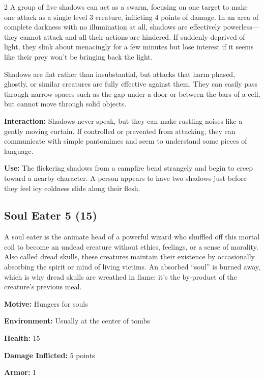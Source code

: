 \begin{multicols}{2}
A group of five shadows can act as a swarm, focusing on one target to make one attack as a single level 3 creature, inflicting 4 points of damage. In an area of complete darkness with no illumination at all, shadows are effectively powerless—they cannot attack and all their actions are hindered. If suddenly deprived of light, they slink about menacingly for a few minutes but lose interest if it seems like their prey won’t be bringing back the light. 

Shadows are flat rather than insubstantial, but attacks that harm phased, ghostly, or similar creatures are fully effective against them. They can easily pass through narrow spaces such as the gap under a door or between the bars of a cell, but cannot move through solid objects. 

\textbf{Interaction:} Shadows never speak, but they can make rustling noises like a gently moving curtain. If controlled or prevented from attacking, they can communicate with simple pantomimes and seem to understand some pieces of language. 

\textbf{Use:} The flickering shadows from a campfire bend strangely and begin to creep toward a nearby character. A person appears to have two shadows just before they feel icy coldness slide along their flesh.

\subsection{Soul Eater 5 (15)}

A soul eater is the animate head of a powerful wizard who shuffled off this mortal coil to become an undead creature without ethics, feelings, or a sense of morality. Also called dread skulls, these creatures maintain their existence by occasionally absorbing the spirit or mind of living victims. An absorbed “soul” is burned away, which is why dread skulls are wreathed in flame; it’s the by-product of the creature’s previous meal. 

\textbf{Motive:} Hungers for souls 

\textbf{Environment:} Usually at the center of tombs 

\textbf{Health:} 15 

\textbf{Damage Inflicted:} 5 points 

\textbf{Armor:} 1 


\end{multicols}
